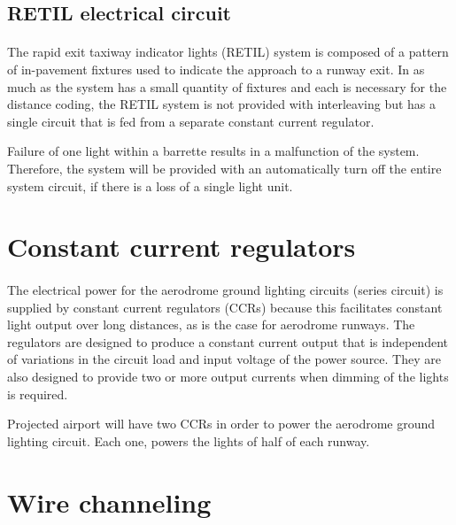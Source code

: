 		\subsection{RETIL electrical circuit}
		\paragraph{} The rapid exit taxiway indicator lights (RETIL) system is composed of a pattern of in-pavement fixtures used to indicate the approach to a runway exit. In as much as the system has a small quantity of fixtures and each is necessary for the distance coding, the RETIL system is not provided with interleaving but has a single circuit that is fed from a separate constant current regulator.
		
		Failure of one light within a barrette results in a malfunction of the system. Therefore, the system will be provided with an automatically turn off the entire system circuit, if there is a loss of a single light unit.
				
		
	\section{Constant current regulators}
	\paragraph{} The electrical power for the aerodrome ground lighting circuits (series circuit) is supplied by constant current regulators (CCRs) because this facilitates constant light output over long distances, as is the case for aerodrome runways. The regulators are designed to produce a constant current output that is independent of variations in the circuit load and input voltage of the power source. They are also designed to provide two or more output currents when
	dimming of the lights is required. 
	
	Projected airport will have two CCRs in order to power the aerodrome ground lighting circuit. Each one, powers the lights of half of each runway.
	
	
	\section{Wire channeling}
	

